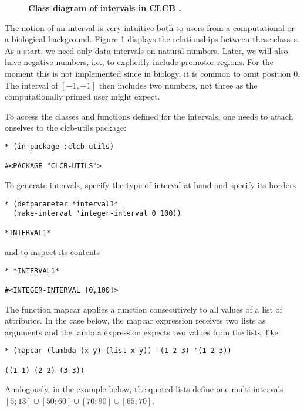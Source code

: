 \documentclass{book}
\newcommand\CLCB{CLCB }
\begin{document}
\begin{figure}
\begin{center}

\end{center}
\caption{{\bf Class diagram of intervals in \CLCB.} }
\label{fig:intervalClassDiagram}
\end{figure}

The notion of an interval is very intuitive both to users from a computational
or a biological background. Figure \ref{fig:intervalClassDiagram} displays
the relationships between these classes. As a start, we need only data intervals
on natural numbers. Later, we will also have negative numbers, i.e., to explicitly
include promotor regions. For the moment this is not implemented since in biology,
it is common to omit position 0. The interval of $[ -1, -1 ]$ then includes two numbers,
not three as the computationally primed user might expect.

To access the classes and functions defined for the intervals, one needs to attach onselves to the clcb-utils package:

\begin{lstlisting}
* (in-package :clcb-utils)

#<PACKAGE "CLCB-UTILS">
\end{lstlisting}


To generate intervals, specify the type of interval at hand and specify its borders
\begin{lstlisting}
* (defparameter *interval1*
  (make-interval 'integer-interval 0 100))

*INTERVAL1*
\end{lstlisting}

and to inspect its contents

\begin{lstlisting}
* *INTERVAL1*

#<INTEGER-INTERVAL [0,100]>
\end{lstlisting}

The function mapcar applies a function consecutively to all values of a list of attributes. 
In the case below, the mapcar expression receives two lists as arguments and the lambda
expression expects two values from the lists, like
\begin{lstlisting}
* (mapcar (lambda (x y) (list x y)) '(1 2 3) '(1 2 3))

((1 1) (2 2) (3 3))
\end{lstlisting}

Analogously, in the example below, the quoted lists define one multi-intervals $[5;13]\cup[50;60]\cup[70;90]\cup[65;70]$.
\end{document}

